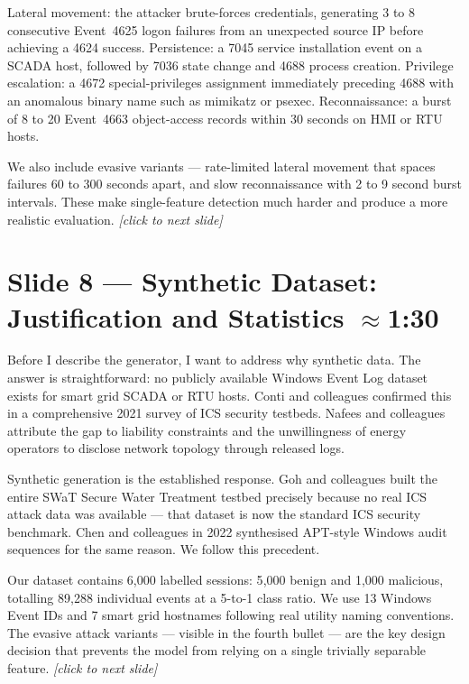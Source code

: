 \documentclass[14pt]{article}
\begin{document}
Lateral movement: the attacker brute-forces credentials, generating 3 to 8 consecutive Event~4625 logon failures from an unexpected source IP before achieving a 4624 success. Persistence: a 7045 service installation event on a SCADA host, followed by 7036 state change and 4688 process creation. Privilege escalation: a 4672 special-privileges assignment immediately preceding 4688 with an anomalous binary name such as mimikatz or psexec. Reconnaissance: a burst of 8 to 20 Event~4663 object-access records within 30 seconds on HMI or RTU hosts.

We also include evasive variants --- rate-limited lateral movement that spaces failures 60 to 300 seconds apart, and slow reconnaissance with 2 to 9 second burst intervals. These make single-feature detection much harder and produce a more realistic evaluation. \textit{[click to next slide]}

\section*{Slide 8 — Synthetic Dataset: Justification and Statistics \hfill \normalfont\small $\approx$1:30}

Before I describe the generator, I want to address why synthetic data. The answer is straightforward: no publicly available Windows Event Log dataset exists for smart grid SCADA or RTU hosts. Conti and colleagues confirmed this in a comprehensive 2021 survey of ICS security testbeds. Nafees and colleagues attribute the gap to liability constraints and the unwillingness of energy operators to disclose network topology through released logs.

Synthetic generation is the established response. Goh and colleagues built the entire SWaT Secure Water Treatment testbed precisely because no real ICS attack data was available --- that dataset is now the standard ICS security benchmark. Chen and colleagues in 2022 synthesised APT-style Windows audit sequences for the same reason. We follow this precedent.

Our dataset contains 6{,}000 labelled sessions: 5{,}000 benign and 1{,}000 malicious, totalling 89{,}288 individual events at a 5-to-1 class ratio. We use 13 Windows Event IDs and 7 smart grid hostnames following real utility naming conventions. The evasive attack variants --- visible in the fourth bullet --- are the key design decision that prevents the model from relying on a single trivially separable feature. \textit{[click to next slide]}
\end{document}
